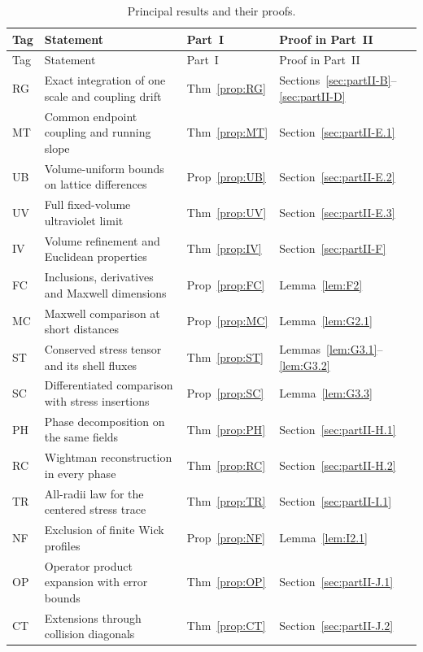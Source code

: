 \begingroup
\small
\setlength{\tabcolsep}{4pt}
\begin{longtable}{@{}p{}p{}p{}p{}@{}}
\caption{Principal results and their proofs.}\label{tab:principal-results}\\
\toprule
Tag & Statement & Part~I & Proof in Part~II\\
\midrule
\endfirsthead
\toprule
Tag & Statement & Part~I & Proof in Part~II\\
\midrule
\endhead
\bottomrule
\endfoot
RG & Exact integration of one scale and coupling drift & Thm~\ref{prop:RG} & Sections~\ref{sec:partII-B}--\ref{sec:partII-D}\\
MT & Common endpoint coupling and running slope & Thm~\ref{prop:MT} & Section~\ref{sec:partII-E.1}\\
UB & Volume-uniform bounds on lattice differences & Prop~\ref{prop:UB} & Section~\ref{sec:partII-E.2}\\
UV & Full fixed-volume ultraviolet limit & Thm~\ref{prop:UV} & Section~\ref{sec:partII-E.3}\\
IV & Volume refinement and Euclidean properties & Thm~\ref{prop:IV} & Section~\ref{sec:partII-F}\\
FC & Inclusions, derivatives and Maxwell dimensions & Prop~\ref{prop:FC} & Lemma~\ref{lem:F2}\\
MC & Maxwell comparison at short distances & Prop~\ref{prop:MC} & Lemma~\ref{lem:G2.1}\\
ST & Conserved stress tensor and its shell fluxes & Thm~\ref{prop:ST} & Lemmas~\ref{lem:G3.1}--\ref{lem:G3.2}\\
SC & Differentiated comparison with stress insertions & Prop~\ref{prop:SC} & Lemma~\ref{lem:G3.3}\\
PH & Phase decomposition on the same fields & Thm~\ref{prop:PH} & Section~\ref{sec:partII-H.1}\\
RC & Wightman reconstruction in every phase & Thm~\ref{prop:RC} & Section~\ref{sec:partII-H.2}\\
TR & All-radii law for the centered stress trace & Thm~\ref{prop:TR} & Section~\ref{sec:partII-I.1}\\
NF & Exclusion of finite Wick profiles & Prop~\ref{prop:NF} & Lemma~\ref{lem:I2.1}\\
OP & Operator product expansion with error bounds & Thm~\ref{prop:OP} & Section~\ref{sec:partII-J.1}\\
CT & Extensions through collision diagonals & Thm~\ref{prop:CT} & Section~\ref{sec:partII-J.2}\\
\end{longtable}
\endgroup

